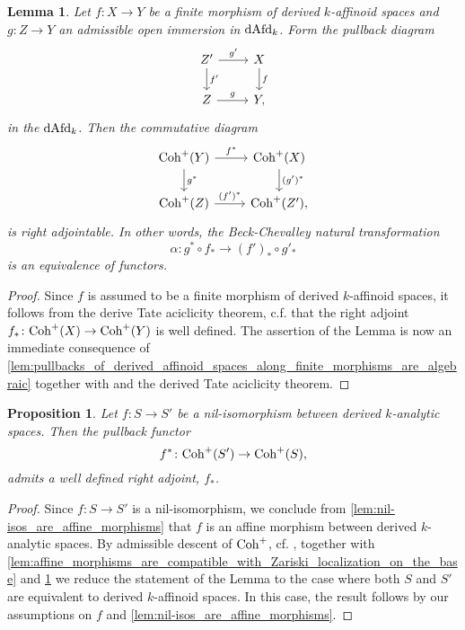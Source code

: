 \documentclass[10pt,a4paper,reqno]{amsart} %
\theoremstyle{plain}
\newtheorem{lem}[thm]{Lemma}
\newtheorem{prop}[thm]{Proposition}
\theoremstyle{definition}
\theoremstyle{remark}
\numberwithin{equation}{section}
\begin{document}
\begin{lem} \label{lem:Beck_Chevalley_natural_transformation_equivalence}
    Let $f \colon X \to Y$ be a finite morphism of derived $k$-affinoid spaces and $g \colon Z \to Y$ an admissible open immersion in $\mathrm{dAfd}_k$. Form the pullback diagram
        \[
        \begin{tikzcd}
            Z' \ar{r}{g'}  \ar{d}{f'} & X \ar{d}{f} \\
            Z \ar{r}{g} & Y,
        \end{tikzcd}
        \]
    in the \infcat $\mathrm{dAfd}_k$.
    Then the commutative diagram
        \[
        \begin{tikzcd}
            \Coh^+(Y) \ar{r}{f^*} \ar{d}{g^*} & \Coh^+(X) \ar{d}{(g')^*} \\
            \Coh^+(Z) \ar{r}{(f')^*} & \Coh^+(Z'),
        \end{tikzcd}
        \]
    is right adjointable. In other words, the Beck-Chevalley natural transformation
        \[
            \alpha \colon g^* \circ f_* \to (f')_* \circ g'_* 
        \]
    is an equivalence of functors.
\end{lem}

\begin{proof}
    Since $f$ is assumed to be a finite morphism of derived $k$-affinoid spaces, it follows from the derive Tate aciclicity theorem, c.f. \cite[Theorem 3.1]{Porta_Yu_Derived_Hom_spaces}
    that the right adjoint $f_* \colon \mathrm{Coh}^+(X) \to \mathrm{Coh}^+(Y)$ is well defined. The assertion of the Lemma is now an immediate consequence of \cref{lem:pullbacks_of_derived_affinoid_spaces_along_finite_morphisms_are_algebraic}
    together with \cite[Proposition 2.5.4.5]{Lurie_SAG} and the derived Tate aciclicity theorem.
\end{proof}

\begin{prop} \label{lem:f^*_admits_a_right_adjoint_whenever_f_is_nil-iso}
    Let $f \colon S \to S'$ be a nil-isomorphism between derived $k$-analytic spaces. Then the pullback functor
        \[
            f^* \colon \mathrm{Coh}^+(S') \to \mathrm{Coh}^+(S),  
        \]
    admits a well defined right adjoint, $f_*$.
\end{prop}

\begin{proof}
    Since $f \colon S \to S'$ is a nil-isomorphism, we conclude from \cref{lem:nil-isos_are_affine_morphisms} that $f$ is an affine morphism
    between derived $k$-analytic spaces. By admissible descent of $\mathrm{Coh}^+$, cf. \cite[Theorem 3.7]{Antonio_Porta_Nonarchimedean_Hilbert},
    together with \cref{lem:affine_morphisms_are_compatible_with_Zariski_localization_on_the_base} and \cref{lem:Beck_Chevalley_natural_transformation_equivalence} we reduce the statement of the Lemma to the case
    where both $S$ and $S'$ are equivalent to derived $k$-affinoid spaces. In this case, the result follows by our assumptions on $f$ and \cref{lem:nil-isos_are_affine_morphisms}.
\end{proof}
\end{document}

